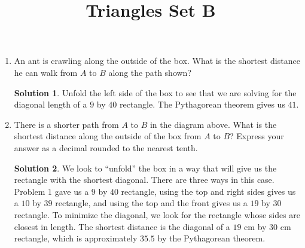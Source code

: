 \documentclass{article}
\title{Triangles Set B}
\date{}
\author{}
\theoremstyle{definition}
\newtheorem*{solution}{Solution}
\begin{document}
\maketitle

\begin{multicols}{2}
    \begin{enumerate}
        \item An ant is crawling along the outside of the box.
            What is the shortest distance he can walk from $A$ to $B$ along the path shown?
            \begin{center}
            \end{center}
            \begin{solution}
                Unfold the left side of the box to see that we are solving for the diagonal length of a $9$ by $40$ rectangle.
                The Pythagorean theorem gives us $41$.
            \end{solution}
        \item There is a shorter path from $A$ to $B$ in the diagram above.
            What is the shortest distance along the outside of the box from $A$ to $B$?
            Express your answer as a decimal rounded to the nearest tenth.
            \begin{solution}
                We look to ``unfold'' the box in a way that will give us the rectangle with the shortest diagonal.
                There are three ways in this case.
                Problem $1$ gave us a $9$ by $40$ rectangle, using the top and right sides gives us a $10$ by $39$ rectangle, and using the top and the front gives us a $19$ by $30$ rectangle.
                To minimize the diagonal, we look for the rectangle whose sides are closest in length.
                The shortest distance is the diagonal of a $19$ cm by $30$ cm rectangle, which is approximately $35.5$ by the Pythagorean theorem.

\end{solution}
\end{enumerate}
\end{multicols}
\end{document}
